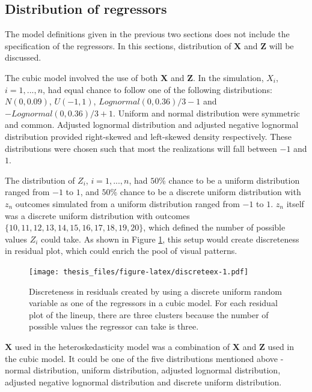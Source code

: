 \documentclass{monashthesis}
\theoremstyle{definition}
\theoremstyle{definition}
\theoremstyle{definition}
\theoremstyle{definition}
\theoremstyle{remark}
\begin{document}
\hypertarget{distribution-of-regressors}{%
\subsection{Distribution of regressors}\label{distribution-of-regressors}}

The model definitions given in the previous two sections does not include the specification of the regressors. In this sections, distribution of \(\boldsymbol{X}\) and \(\boldsymbol{Z}\) will be discussed.

The cubic model involved the use of both \(\boldsymbol{X}\) and \(\boldsymbol{Z}\). In the simulation, \(X_i\), \(i=1,...,n\), had equal chance to follow one of the following distributions: \(N(0, 0.09)\), \(U(-1, 1)\), \(Lognormal(0,0.36)/3 - 1\) and \(-Lognormal(0,0.36)/3 + 1\). Uniform and normal distribution were symmetric and common. Adjusted lognormal distribution and adjusted negative lognormal distribution provided right-skewed and left-skewed density respectively. These distributions were chosen such that most the realizations will fall between \(-1\) and \(1\).

The distribution of \(Z_i\), \(i=1,...,n\), had \(50\)\% chance to be a uniform distribution ranged from \(-1\) to \(1\), and \(50\)\% chance to be a discrete uniform distribution with \(z_n\) outcomes simulated from a uniform distribution ranged from \(-1\) to \(1\). \(z_n\) itself was a discrete uniform distribution with outcomes \(\{10,11,12,13,14,15,16,17,18,19,20\}\), which defined the number of possible values \(Z_i\) could take. As shown in Figure \ref{fig:discreteex}, this setup would create discreteness in residual plot, which could enrich the pool of visual patterns.

\begin{figure}
\centering
\texttt{[image: thesis\_files/figure-latex/discreteex-1.pdf]}
\caption{\label{fig:discreteex}Discreteness in residuals created by using a discrete uniform random variable as one of the regressors in a cubic model. For each residual plot of the lineup, there are three clusters because the number of possible values the regressor can take is three.}
\end{figure}

\(\boldsymbol{X}\) used in the heteroskedasticity model was a combination of \(\boldsymbol{X}\) and \(\boldsymbol{Z}\) used in the cubic model. It could be one of the five distributions mentioned above - normal distribution, uniform distribution, adjusted lognormal distribution, adjusted negative lognormal distribution and discrete uniform distribution.
\end{document}
